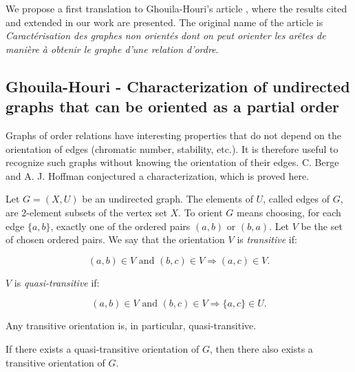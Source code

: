 \documentclass[runningheads]{llncs}
\begin{document}
We propose a first translation to Ghouila-Houri's article \cite{GhouilaHouri}, where the results cited and extended in our work are presented. The original name of the article is \textit{Caractérisation des graphes non orientés dont
on peut orienter les arêtes de manière à obtenir le graphe d'une
relation d'ordre}.


\subsection{Ghouila-Houri - Characterization of undirected graphs that can be oriented as a partial order}


Graphs of order relations have interesting properties that do not depend on the orientation of edges (chromatic number, stability, etc.). It is therefore useful to recognize such graphs without knowing the orientation of their edges. C. Berge and A. J. Hoffman conjectured a characterization, which is proved here.

\vspace{2ex}

Let $G = (X, U)$ be an undirected graph. The elements of $U$, called edges of $G$, are 2-element subsets of the vertex set $X$. To orient $G$ means choosing, for each edge $\{a,b\}$, exactly one of the ordered pairs $(a,b)$ or $(b,a)$. Let $V$ be the set of chosen ordered pairs. We say that the orientation $V$ is \emph{transitive} if:

\[
(a,b) \in V \text{ and } (b,c) \in V \Rightarrow (a,c) \in V.
\]

$V$ is \emph{quasi-transitive} if:

\[
(a,b) \in V \text{ and } (b,c) \in V \Rightarrow \{a,c\} \in U.
\]

Any transitive orientation is, in particular, quasi-transitive.

\begin{lemma}
If there exists a quasi-transitive orientation of $G$, then there also exists a transitive orientation of $G$.
\end{lemma}
\end{document}
